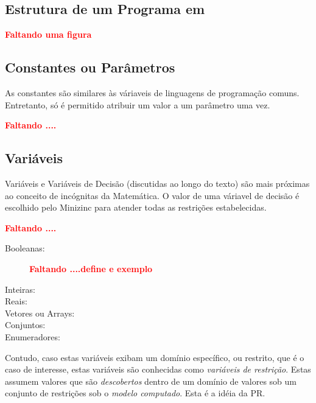 \subsection{Estrutura de um Programa em \minizinc}

{\bf \textcolor{red}{Faltando uma figura}}


\subsection{Constantes ou Parâmetros}



As constantes são similares às váriaveis de linguagens de programação comuns. Entretanto, só é permitido atribuir 
um valor a um parâmetro uma vez.

{\bf \textcolor{red}{Faltando ....}}

\subsection{Variáveis}

Variáveis e Variáveis de Decisão (discutidas ao longo do texto) são mais próximas ao conceito de incógnitas da Matemática. O valor de uma váriavel de decisão 
é escolhido pelo Minizinc para atender todas as restrições estabelecidas.


{\bf \textcolor{red}{Faltando ....}}


\begin{description}

  \item[Booleanas:] 
{\bf \textcolor{red}{Faltando ....define e exemplo}}
  
    \item[Inteiras:]
      \item[Reais:]
        \item[Vetores ou Arrays:]
                \item[Conjuntos:]
                
                \item[Enumeradores:]
\end{description}

Contudo, caso estas variáveis exibam um domínio
específico, ou restrito, que é o caso de interesse,
estas variáveis são conhecidas como
\textit{variáveis de restrição}.
Estas assumem valores que   são {\em descobertos} dentro de um domínio 
de valores sob um conjunto de restrições sob  o  \textit{modelo  computado}. Esta é a idéia da PR.


